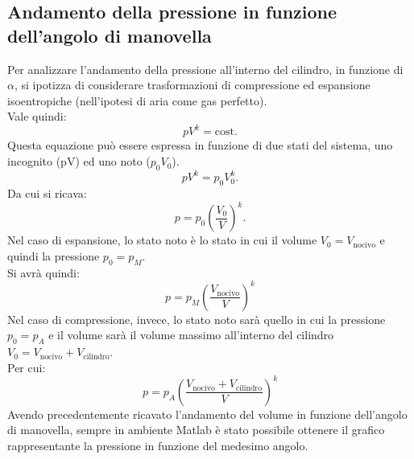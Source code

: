 \subsection{Andamento della pressione in funzione dell'angolo di manovella}
Per analizzare l’andamento della pressione all’interno del cilindro, in funzione di $\alpha$, si ipotizza di considerare trasformazioni di compressione ed espansione isoentropiche (nell’ipotesi di aria come gas perfetto).\\
Vale quindi:
\begin{equation}
    pV^k=\mathrm{cost}.
\end{equation}
Questa equazione può essere espressa in funzione di due stati del sistema, uno incognito (pV) ed uno noto ($p_0V_0$).
\begin{equation}
    pV^k=p_0V_0^k.
\end{equation}
Da cui si ricava:
\begin{equation}
    p=p_0\left(\frac{V_0}{V}\right)^k.
\end{equation}
Nel caso di espansione, lo stato noto è lo stato in cui il volume $V_0=V_{\mathrm{nocivo}}$ e quindi la pressione $p_0=p_M$.\\
Si avrà quindi:
\begin{equation}
    p=p_M\left(\frac{V_{\mathrm{nocivo}}}{V}\right)^k
\end{equation}
Nel caso di compressione, invece, lo stato noto sarà quello in cui la pressione $p_0=p_A$ e il volume sarà il volume massimo all’interno del cilindro
$V_0=V_{\mathrm{nocivo}}+V_{\mathrm{cilindro}}$.\\
Per cui:
\begin{equation}
    p=p_A\left(\frac{V_{\mathrm{nocivo}}+V_{\mathrm{cilindro}}}{V}\right)^k
\end{equation}
Avendo precedentemente ricavato l’andamento del volume in funzione dell’angolo di manovella, sempre in ambiente Matlab è stato possibile ottenere il grafico rappresentante la pressione in funzione del medesimo angolo.\\
